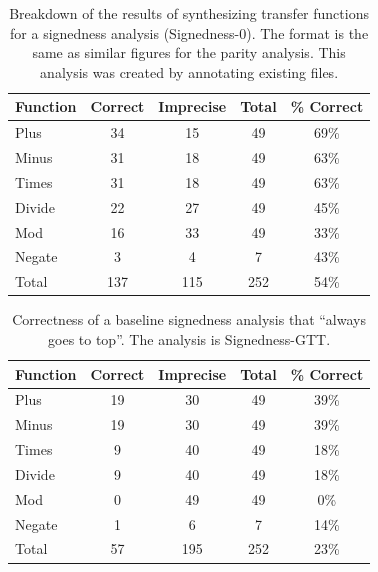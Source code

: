 \documentclass[10pt,conference]{IEEEtran}
\begin{document}
\begin{table}
\centering
 \begin{tabular}{l c c c c }
  
  Function & Correct & Imprecise & Total & \% Correct\\ 
  \midrule
  Plus & 34 & 15 & 49 & 69\% \\
  Minus & 31 & 18 & 49 & 63\% \\
  Times & 31 & 18 & 49 & 63\% \\
  Divide & 22 & 27 & 49 & 45\% \\
  Mod & 16 & 33 & 49 & 33\% \\
  Negate & 3 & 4 & 7 & 43\% \\
  \midrule
  Total & 137 & 115 & 252 & 54\% \\
 \end{tabular}
 \caption{Breakdown of the results of synthesizing transfer functions
 for a signedness analysis (Signedness-0). The format is the same
 as similar figures for the parity analysis. This analysis was
 created by annotating existing files.}
 \label{tab-sign0}
\end{table}

\begin{table}
\centering
 \begin{tabular}{l c c c c }
  
  Function & Correct & Imprecise & Total & \% Correct\\ 
  \midrule
  Plus & 19 & 30 & 49 & 39\%\\
  Minus & 19 & 30 & 49 & 39\% \\
  Times & 9 & 40 & 49 & 18\% \\
  Divide & 9 & 40 & 49 & 18\% \\
  Mod & 0 & 49 & 49 & 0\% \\
  Negate & 1 & 6 & 7 & 14\% \\
  \midrule
  Total & 57 & 195 & 252 & 23\% \\
 \end{tabular}
 \caption{Correctness of a baseline signedness analysis
 that ``always goes to top''. The analysis is Signedness-GTT.}
 \label{tab-topsign}
\end{table}
\end{document}
